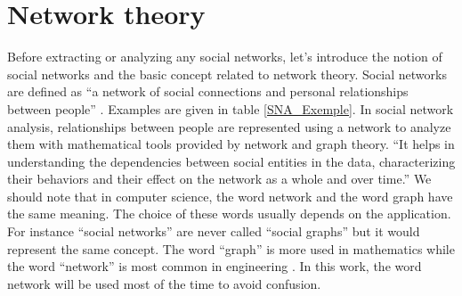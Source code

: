 \documentclass[a4paper, 12pt]{report}
\begin{document}
\chapter{Network theory}
\begin{table}
\center
{}
\caption{Example of social networks \citep{SNA_Overview}}\label{SNA_Exemple}
\end{table}

Before extracting or analyzing any social networks, let's introduce the notion of social networks and the basic concept related to network theory.
Social networks are defined as ``a network of social connections and personal relationships between people'' \citep{SNA_Overview}. Examples are given in table \ref{SNA_Exemple}.
In social network analysis, relationships between people are represented using a network to analyze them with mathematical tools provided by network
and graph theory. ``It helps in understanding the
dependencies between social entities in the data, characterizing
their behaviors and their effect on the network as
a whole and over time.'' \citep{SNA_Overview}
We should note that in computer science, the word network and the word graph have the same meaning. The choice of these words usually depends on the application. For instance ``social networks'' are never called ``social graphs''
but it would represent the same concept. The word ``graph'' is more used in mathematics while the word ``network'' is most common in engineering \citep{network_theory}. In this work, the word network will be used most of the time to avoid confusion.
\end{document}
